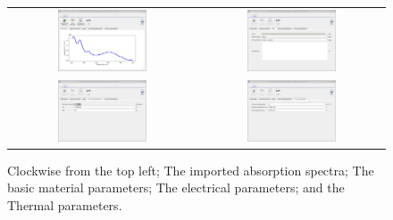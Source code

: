 \begin{figure}
\centering
\begin{tabular}{ c c }

\includegraphics[width=0.5\textwidth,height=0.4\textwidth]{./images/database_materials/database_final.png}

&
\includegraphics[width=0.5\textwidth,height=0.4\textwidth]{./images/database_materials/database_material_basic.png}
\\

\includegraphics[width=0.5\textwidth,height=0.4\textwidth]{./images/database_materials/database_electrical_parameters.png}

&
\includegraphics[width=0.5\textwidth,height=0.4\textwidth]{./images/database_materials/database_thermal_params.png}
\\
\end{tabular}
\caption{Clockwise from the top left; The imported absorption spectra; The basic material parameters; The electrical parameters; and the Thermal parameters.}
\label{fig:materialadd7}
\end{figure}


